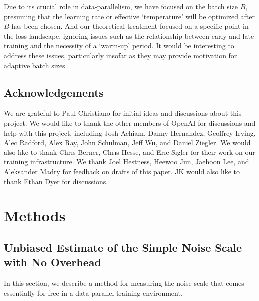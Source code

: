 \documentclass[english]{article}
\begin{document}
Due to its crucial role in data-parallelism, we have focused on the batch size $B$, presuming that the learning rate or effective `temperature' will be optimized after $B$ has been chosen. And our theoretical treatment focused on a specific point in the loss landscape, ignoring issues such as the relationship between early and late training and the necessity of a `warm-up' period. It would be interesting to address these issues, particularly insofar as they may provide  motivation for adaptive batch sizes.


\subsection*{Acknowledgements}
We are grateful to Paul Christiano for initial ideas and discussions about this project. We would like to thank the other members of OpenAI for discussions and help with this project, including Josh Achiam, Danny Hernandez, Geoffrey Irving,  Alec Radford, Alex Ray, John Schulman, Jeff Wu, and Daniel Ziegler.  We would also like to thank Chris Berner, Chris Hesse, and Eric Sigler for their work on our training infrastructure.  We thank Joel Hestness, Heewoo Jun, Jaehoon Lee, and Aleksander Madry for feedback on drafts of this paper.  JK would also like to thank Ethan Dyer for discussions.

\clearpage

\appendix

\section{Methods}
\label{app:Methods}

\subsection{Unbiased Estimate of the Simple Noise Scale with No Overhead}

\label{subsec:noise-scale-measurement}
In this section, we describe a method for measuring the noise scale that comes essentially for free in a data-parallel training environment.
\end{document}
